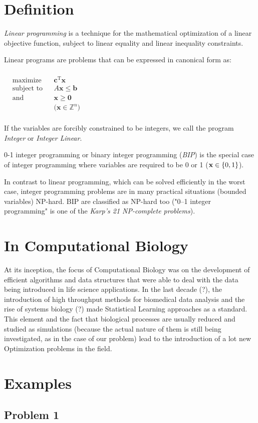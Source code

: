 \section{Definition} 
\textit{Linear programming} is a technique for the mathematical optimization of a linear objective function, subject to linear equality and linear inequality constraints.

Linear programs are problems that can be expressed in canonical form as:
\paragraph{}

${\displaystyle {\begin{aligned}
	&{\text{maximize}}&&\mathbf {c} ^{\mathrm {T} }\mathbf {x}
	\\&{\text{subject to}}&&A\mathbf {x} \leq \mathbf {b}
	\\&{\text{and}}&&\mathbf {x} \geq \mathbf {0}
	\\&&&{\text{(}}\mathbf {x} \in \mathbb {Z} ^{n}\text{)}
	\\&
	\end{aligned}}} $


If the variables are forcibly constrained to be integers, we call the program \textit{Integer} or \textit{Integer Linear}.

0-1 integer programming or binary integer programming (\textit{BIP}) is the special case of integer programming where variables are required to be 0 or 1 ($\mathbf {x} \in \mathbb \{0,1\} $).

In contrast to linear programming, which can be solved efficiently in the worst case, integer programming problems are in many practical situations (bounded variables) NP-hard. BIP are classified as NP-hard too ("0–1 integer programming" is one of the \textit{Karp's 21 NP-complete problems}).

\section{In Computational Biology}
At its inception, the focus of Computational Biology was on the development of efficient algorithms and data structures that were able to deal with the data being introduced in life science applications. In the last decade (?), the introduction of high throughput methods for biomedical data analysis and the rise of systems biology (?) made Statistical Learning approaches as a standard. This element and the fact that biological processes are usually reduced and studied as simulations (because the actual nature of them is still being investigated, as in the case of our problem) lead to the introduction of a lot new Optimization problems in the field.




\section{Examples}
\subsection{Problem 1}